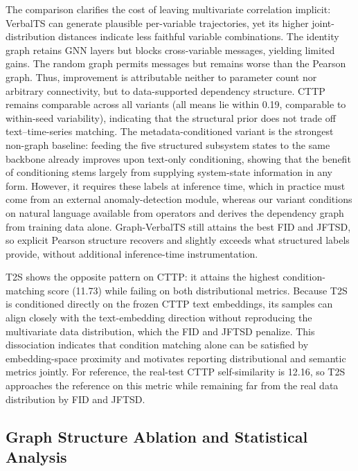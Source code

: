 \documentclass[conference]{IEEEtran}
\begin{document}
The comparison clarifies the cost of leaving multivariate correlation implicit: VerbalTS can generate plausible per-variable trajectories, yet its higher joint-distribution distances indicate less faithful variable combinations. The identity graph retains GNN layers but blocks cross-variable messages, yielding limited gains. The random graph permits messages but remains worse than the Pearson graph. Thus, improvement is attributable neither to parameter count nor arbitrary connectivity, but to data-supported dependency structure. CTTP remains comparable across all variants (all means lie within 0.19, comparable to within-seed variability), indicating that the structural prior does not trade off text--time-series matching. The metadata-conditioned variant is the strongest non-graph baseline: feeding the five structured subsystem states to the same backbone already improves upon text-only conditioning, showing that the benefit of conditioning stems largely from supplying system-state information in any form. However, it requires these labels at inference time, which in practice must come from an external anomaly-detection module, whereas our variant conditions on natural language available from operators and derives the dependency graph from training data alone. Graph-VerbalTS still attains the best FID and JFTSD, so explicit Pearson structure recovers and slightly exceeds what structured labels provide, without additional inference-time instrumentation.

T2S shows the opposite pattern on CTTP: it attains the highest condition-matching score (11.73) while failing on both distributional metrics. Because T2S is conditioned directly on the frozen CTTP text embeddings, its samples can align closely with the text-embedding direction without reproducing the multivariate data distribution, which the FID and JFTSD penalize. This dissociation indicates that condition matching alone can be satisfied by embedding-space proximity and motivates reporting distributional and semantic metrics jointly. For reference, the real-test CTTP self-similarity is 12.16, so T2S approaches the reference on this metric while remaining far from the real data distribution by FID and JFTSD.

\subsection{Graph Structure Ablation and Statistical Analysis}
\end{document}
